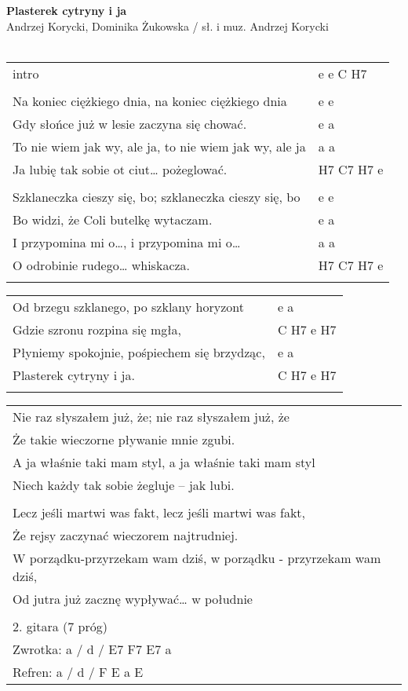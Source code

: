 \documentclass[a5paper]{article}
\begin{document}


\noindent
\fontsize{12pt}{15pt}\selectfont
\textbf{Plasterek cytryny i ja} \\
\fontsize{8pt}{10pt}\selectfont
Andrzej Korycki, Dominika Żukowska / sł. i muz. Andrzej Korycki \\ \\
\fontsize{10pt}{12pt}\selectfont
{}
\begin{tabular}{@{}p{8.50cm}p{3cm}@{}}
\noindent
intro & e e C H7 \\ \\
Na koniec ciężkiego dnia, na koniec ciężkiego dnia & e e \\
Gdy słońce już w lesie zaczyna się chować. & e a \\
To nie wiem jak wy, ale ja, to nie wiem jak wy, ale ja & a a \\
Ja lubię tak sobie ot ciut… pożeglować. & H7 C7 H7 e \\ \\

Szklaneczka cieszy się, bo; szklaneczka cieszy się, bo & e e \\
Bo widzi, że Coli butelkę wytaczam. & e a \\
I przypomina mi o…, i przypomina mi o… & a a \\
O odrobinie rudego… whiskacza. & H7 C7 H7 e \\ \\
\end{tabular}

\noindent
\begin{tabular}{@{}p{7.50cm}p{3cm}@{}}
Od brzegu szklanego, po szklany horyzont & e a \\
Gdzie szronu rozpina się mgła, & C H7 e H7 \\
Płyniemy spokojnie, pośpiechem się brzydząc, & e a \\
Plasterek cytryny i ja. & C H7 e H7 \\ \\
\end{tabular}

\noindent
\begin{tabular}{@{}p{11.50cm}@{}}
Nie raz słyszałem już, że; nie raz słyszałem już, że \\
Że takie wieczorne pływanie mnie zgubi. \\
A ja właśnie taki mam styl, a ja właśnie taki mam styl \\
Niech każdy tak sobie żegluje – jak lubi. \\ \\

Lecz jeśli martwi was fakt, lecz jeśli martwi was fakt, \\
Że rejsy zaczynać wieczorem najtrudniej. \\
W porządku-przyrzekam wam dziś, w porządku - przyrzekam wam dziś, \\
Od jutra już zacznę wypływać… w południe \\ \\

2. gitara (7 próg) \\
Zwrotka: a / d / E7 F7 E7 a \\
Refren: a / d / F E a E
\end{tabular}
\end{document}

